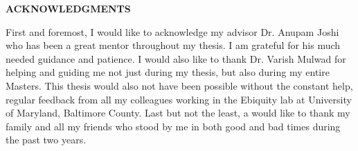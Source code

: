 \newpage
\pagestyle{empty}

\begin{center}
\vspace{0.1in}
\large{\bf ACKNOWLEDGMENTS} \par  
\bigskip \bigskip
\end{center}

\thispagestyle{plain}

First and foremost, I would like to acknowledge my advisor Dr. Anupam Joshi who has been a great mentor throughout my thesis. I am grateful for his much needed guidance and patience. I would also like to thank Dr. Varish Mulwad for helping and guiding me not just during my thesis, but also during my entire Masters. This thesis would also not have been possible without the constant help, regular feedback from all my colleagues working in the Ebiquity lab at University of Maryland, Baltimore County. Last but not the least, a would like to thank my family and all my friends who stood by me in both good and bad times during the past two years.
